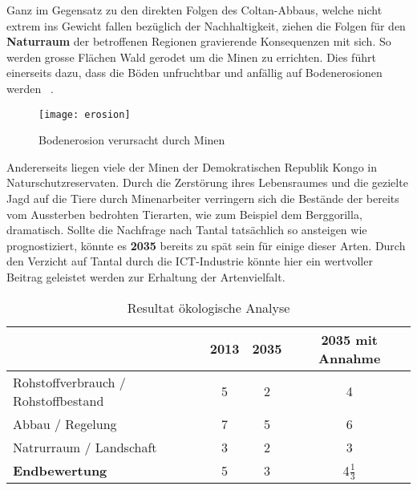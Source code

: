 Ganz im Gegensatz zu den direkten Folgen des Coltan-Abbaus, welche nicht extrem
ins Gewicht fallen bezüglich der Nachhaltigkeit, ziehen die Folgen für den
\textbf{Naturraum} der betroffenen Regionen gravierende Konsequenzen mit sich.
So werden grosse Flächen Wald gerodet um die Minen zu errichten. Dies führt
einerseits dazu, dass die Böden unfruchtbar und anfällig auf Bodenerosionen
werden ~\cite{environmental_management}.

\begin{figure}[h]
\centering
\texttt{[image: erosion]}
\caption{Bodenerosion verursacht durch Minen ~\cite{Coltanmi34:online}}
\label{}
\end{figure}
\pagebreak

Andererseits liegen viele der Minen der Demokratischen Republik Kongo in
Naturschutzreservaten. Durch die Zerstörung ihres Lebensraumes und die gezielte
Jagd auf die Tiere durch Minenarbeiter verringern sich die Bestände der bereits
vom Aussterben bedrohten Tierarten, wie zum Beispiel dem Berggorilla, dramatisch.
Sollte die Nachfrage nach Tantal tatsächlich so ansteigen wie prognostiziert,
könnte es \textbf{2035} bereits zu spät sein für einige dieser Arten.
Durch den Verzicht auf Tantal durch die ICT-Industrie könnte hier ein wertvoller
Beitrag geleistet werden zur Erhaltung der Artenvielfalt.

\begin{table}[h]
  \centering
  \begin{tabular}{l|ccc}                                    & \textbf{2013} & \textbf{2035} & \textbf{2035 mit Annahme}
    \\ \hline Rohstoffverbrauch / Rohstoffbestand                 & 5             & 2             & 4 
    \\ Abbau / Regelung                                           & 7             & 5             & 6
    \\ Natrurraum / Landschaft                                    & 3             & 2             & 3
    \\ \hline \textbf{Endbewertung}                               & 5             & 3             & 4\(\frac{1}{3}\)
  \end{tabular}
  \caption{Resultat ökologische Analyse}
\end{table}
